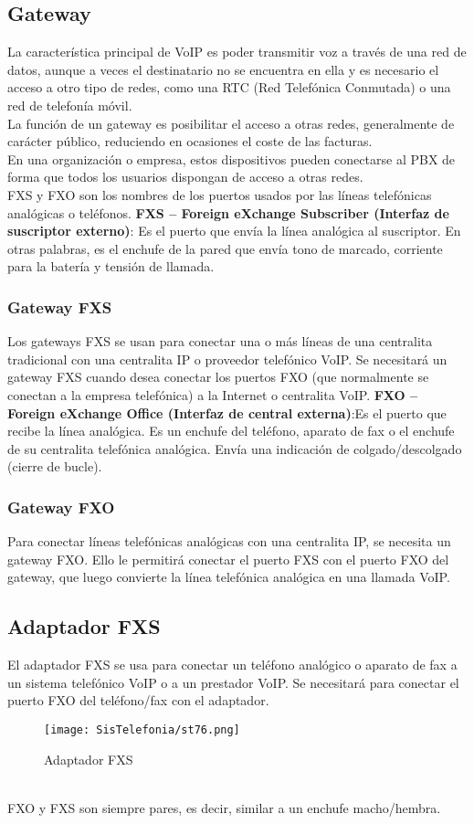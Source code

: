 \documentclass[11pt,fleqn]{book} %
\begin{document}
\subsection{Gateway}
La característica principal de VoIP es poder transmitir voz a través de una red de datos, aunque a veces el destinatario no se encuentra en ella y es necesario el acceso a otro tipo de redes, como una RTC (Red Telefónica Conmutada) o una red de telefonía móvil.\\
La función de un gateway es posibilitar el acceso a otras redes, generalmente de carácter público, reduciendo en ocasiones el coste de las facturas.\\
En una organización o empresa, estos dispositivos pueden conectarse al PBX de forma que todos los usuarios dispongan de acceso a otras redes.\\
FXS y FXO son los nombres de los puertos usados por las líneas telefónicas analógicas o teléfonos.
\textbf{FXS – Foreign eXchange Subscriber (Interfaz de suscriptor externo)}: Es el puerto que envía la línea analógica al suscriptor. En otras palabras, es el enchufe de la pared que envía tono de marcado, corriente para la batería y tensión de llamada.
\subsubsection{Gateway FXS}
Los gateways FXS se usan para conectar una o más líneas de una centralita tradicional con una centralita IP o proveedor telefónico VoIP. 
Se necesitará un gateway FXS cuando desea conectar los puertos FXO (que normalmente se conectan a la empresa telefónica) a la Internet o centralita VoIP.
\textbf{FXO – Foreign eXchange Office (Interfaz de central externa)}:Es el puerto que recibe la línea analógica. Es un enchufe del teléfono, aparato de fax o el enchufe de su centralita telefónica analógica. Envía una indicación de colgado/descolgado (cierre de bucle).
\subsubsection{Gateway FXO}
Para conectar líneas telefónicas analógicas con una centralita IP, se necesita un gateway FXO.
Ello le permitirá conectar el puerto FXS con el puerto FXO del gateway, que luego convierte la línea telefónica analógica en una llamada VoIP.
\subsection{Adaptador FXS}
El adaptador FXS se usa para conectar un teléfono analógico o aparato de fax a un sistema telefónico VoIP o a un prestador VoIP.
Se necesitará para conectar el puerto FXO del teléfono/fax con el adaptador.
\begin{figure}[h!]
\centering
\texttt{[image: SisTelefonia/st76.png]}
\caption{Adaptador FXS}
\label{fig:adaptadorfsx}
\end{figure}
\\
FXO y FXS son siempre pares, es decir, similar a un enchufe macho/hembra.
\end{document}
